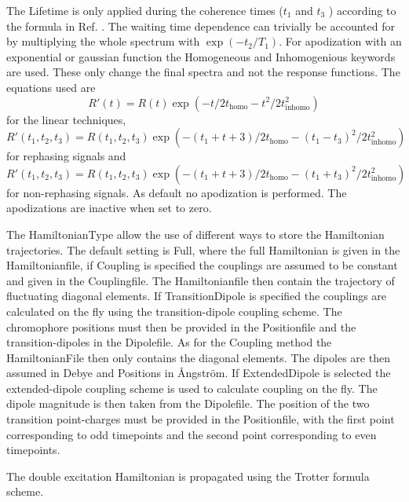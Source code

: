 The Lifetime is only applied during the coherence times ($t_1$ and $t_3$ ) according 
to the formula in Ref. . The waiting time dependence can trivially be accounted for by 
multiplying the whole spectrum with $\exp( -t_2 /T_1 )$. For apodization with an exponential or gaussian function the Homogeneous and Inhomogenious keywords are used. These only change the final spectra and not the response functions. The equations used are
\begin{equation}
R'(t)=R(t)\exp\left(-t/2 t_{\textrm{homo}}-t^2/2 t_{\textrm{inhomo}}^2\right)
\end{equation}
for the linear techniques,
\begin{equation}
R'(t_1,t_2,t_3)=R(t_1,t_2,t_3)\exp\left(-(t_1+t+3)/2 t_{\textrm{homo}}-(t_1-t_3)^2/2 t_{\textrm{inhomo}}^2\right)
\end{equation}
for rephasing signals and
\begin{equation}
R'(t_1,t_2,t_3)=R(t_1,t_2,t_3)
\exp\left(-(t_1+t+3)/2 t_{\textrm{homo}}-(t_1+t_3)^2/2 t_{\textrm{inhomo}}^2\right)
\end{equation}
for non-rephasing signals. As default no apodization is performed. The apodizations are inactive when set to zero.  

The HamiltonianType allow the use of different ways to store the Hamiltonian trajectories. The default setting is Full, where the full Hamiltonian is given in the Hamiltonianfile, if Coupling is specified the couplings are assumed to be constant and given in the Couplingfile. The Hamiltonianfile then contain the trajectory of fluctuating diagonal elements. If TransitionDipole is specified the couplings are calculated on the fly using the transition-dipole coupling scheme. The chromophore positions must then be provided in the Positionfile and the transition-dipoles in the Dipolefile. As for the Coupling method the HamiltonianFile then only contains the diagonal elements. The dipoles are then assumed in Debye and Positions in \AA ngstr\"{o}m. If ExtendedDipole is selected the extended-dipole coupling scheme is used to calculate coupling on the fly. The dipole magnitude is then taken from the Dipolefile. The position of the two transition point-charges must be provided in the Positionfile, with the first point corresponding to odd timepoints and the second point corresponding to even timepoints.

The double excitation Hamiltonian is propagated using the Trotter formula scheme\cite{Paarmann.2008.JCP.128.191103,Jansen.2010.JCP.132.224503}.

